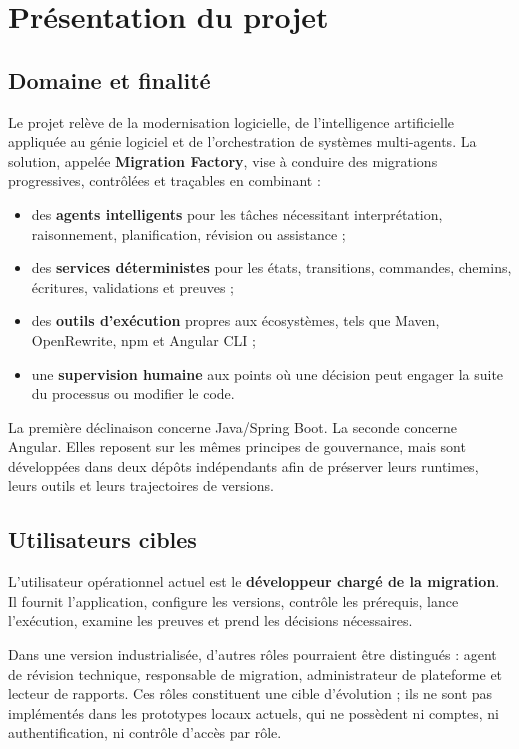 \section{Présentation du projet}

\subsection{Domaine et finalité}

Le projet relève de la modernisation logicielle, de l'intelligence artificielle appliquée au génie logiciel et de l'orchestration de systèmes multi-agents. La solution, appelée \textbf{Migration Factory}, vise à conduire des migrations progressives, contrôlées et traçables en combinant :

\begin{itemize}
    \item des \textbf{agents intelligents} pour les tâches nécessitant interprétation, raisonnement, planification, révision ou assistance ;
    \item des \textbf{services déterministes} pour les états, transitions, commandes, chemins, écritures, validations et preuves ;
    \item des \textbf{outils d'exécution} propres aux écosystèmes, tels que Maven, OpenRewrite, npm et Angular CLI ;
    \item une \textbf{supervision humaine} aux points où une décision peut engager la suite du processus ou modifier le code.
\end{itemize}

La première déclinaison concerne Java/Spring Boot. La seconde concerne Angular. Elles reposent sur les mêmes principes de gouvernance, mais sont développées dans deux dépôts indépendants afin de préserver leurs runtimes, leurs outils et leurs trajectoires de versions.

\subsection{Utilisateurs cibles}

L'utilisateur opérationnel actuel est le \textbf{développeur chargé de la migration}. Il fournit l'application, configure les versions, contrôle les prérequis, lance l'exécution, examine les preuves et prend les décisions nécessaires.

Dans une version industrialisée, d'autres rôles pourraient être distingués : agent de révision technique, responsable de migration, administrateur de plateforme et lecteur de rapports. Ces rôles constituent une cible d'évolution ; ils ne sont pas implémentés dans les prototypes locaux actuels, qui ne possèdent ni comptes, ni authentification, ni contrôle d'accès par rôle.

